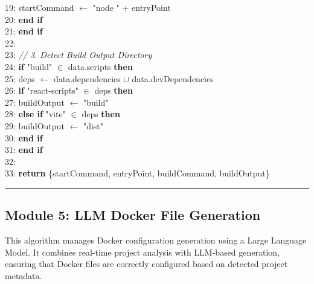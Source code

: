 19: \hspace{1cm}startCommand $\leftarrow$ "node " + entryPoint\\
20: \hspace{0.5cm}\textbf{end if}\\
21: \textbf{end if}\\
22:\\
23: \textit{// 3. Detect Build Output Directory}\\
24: \textbf{if} "build" $\in$ data.scripts \textbf{then}\\
25: \hspace{0.5cm}deps $\leftarrow$ data.dependencies $\cup$ data.devDependencies\\
26: \hspace{0.5cm}\textbf{if} "react-scripts" $\in$ deps \textbf{then}\\
27: \hspace{1cm}buildOutput $\leftarrow$ "build"\\
28: \hspace{0.5cm}\textbf{else if} "vite" $\in$ deps \textbf{then}\\
29: \hspace{1cm}buildOutput $\leftarrow$ "dist"\\
30: \hspace{0.5cm}\textbf{end if}\\
31: \textbf{end if}\\
32:\\
33: \textbf{return} \{startCommand, entryPoint, buildCommand, buildOutput\}\\
\noindent\rule{\textwidth}{0.4pt}

\subsection{Module 5: LLM Docker File Generation}

This algorithm manages Docker configuration generation using a Large Language Model. It combines real-time project analysis with LLM-based generation, ensuring that Docker files are correctly configured based on detected project metadata.

